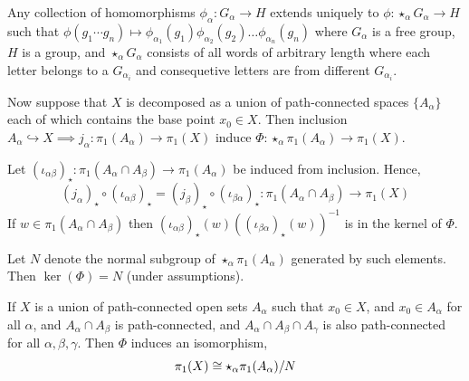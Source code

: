 \documentclass[12pt]{amsart}
\begin{document}

\begin{remark}
    Any collection of homomorphisms $\phi_\alpha: G_\alpha \to H$ extends uniquely to $\phi: \star_\alpha G_\alpha \to H$ such that $\phi(g_1 \cdots g_n) \mapsto \phi_{\alpha_1}(g_1)\phi_{\alpha_2}(g_2)\ldots \phi_{\alpha_n}(g_n)$ where $G_\alpha$ is a free group, $H$ is a group, and $\star_\alpha G_\alpha$ consists of all words of arbitrary length where each letter belongs to a $G_{\alpha_i}$ and consequetive letters are from different $G_{\alpha_i}$. 

    Now suppose that $X$ is decomposed as a union of path-connected spaces $\{A_\alpha\}$ each of which contains the base point $x_0 \in X$. Then inclusion $A_\alpha \hookrightarrow X \implies j_\alpha: \pi_1(A_\alpha) \to \pi_1(X)$ induce $\Phi: \star_\alpha \pi_1(A_\alpha)  \to \pi_1(X)$. 

    Let $(\iota_{\alpha\beta})_\star: \pi_1(A_\alpha \cap A_\beta) \to \pi_1(A_\alpha)$ be induced from inclusion. Hence, 
    \[(j_\alpha)_\star \circ (\iota_{\alpha \beta})_\star = (j_\beta)_\star \circ (\iota_{\beta\alpha})_\star: \pi_1(A_\alpha \cap A_\beta) \to \pi_1(X)\]
    If $w \in \pi_1(A_\alpha \cap A_\beta)$ then $(\iota_{\alpha\beta})_\star (w) \left((\iota_{\beta\alpha})_\star (w)\right)^{-1}$ is in the kernel of $\Phi$. 

    Let $N$ denote the normal subgroup of $\star_\alpha \pi_1(A_\alpha)$ generated by such elements. Then $\ker(\Phi) = N$ (under assumptions). 
\end{remark}

\begin{theorem}

    If $X$ is a union of path-connected open sets $A_\alpha$ such that $x_0 \in X$, and $x_0 \in A_\alpha$ for all $\alpha$, and $A_\alpha \cap A_\beta$ is path-connected, and $A_\alpha \cap A_\beta \cap A_\gamma$ is also path-connected for all $\alpha, \beta, \gamma$. Then $\Phi$ induces an isomorphism,
    \[\pi_1(X) \cong \star_\alpha \pi_1(A_\alpha) / N\]
\end{theorem}
\end{document}
